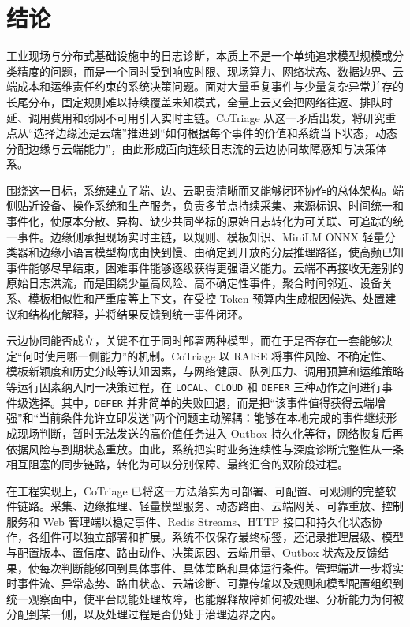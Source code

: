 \chapter{结论}

工业现场与分布式基础设施中的日志诊断，本质上不是一个单纯追求模型规模或分类精度的问题，而是一个同时受到响应时限、现场算力、网络状态、数据边界、云端成本和运维责任约束的系统决策问题。面对大量重复事件与少量复杂异常并存的长尾分布，固定规则难以持续覆盖未知模式，全量上云又会把网络往返、排队时延、调用费用和弱网不可用引入实时主链。CoTriage 从这一矛盾出发，将研究重点从“选择边缘还是云端”推进到“如何根据每个事件的价值和系统当下状态，动态分配边缘与云端能力”，由此形成面向连续日志流的云边协同故障感知与决策体系。

围绕这一目标，系统建立了端、边、云职责清晰而又能够闭环协作的总体架构。端侧贴近设备、操作系统和生产服务，负责多节点持续采集、来源标识、时间统一和事件化，使原本分散、异构、缺少共同坐标的原始日志转化为可关联、可追踪的统一事件。边缘侧承担现场实时主链，以规则、模板知识、MiniLM ONNX 轻量分类器和边缘小语言模型构成由快到慢、由确定到开放的分层推理路径，使高频已知事件能够尽早结束，困难事件能够逐级获得更强语义能力。云端不再接收无差别的原始日志洪流，而是围绕少量高风险、高不确定性事件，聚合时间邻近、设备关系、模板相似性和严重度等上下文，在受控 Token 预算内生成根因候选、处置建议和结构化解释，并将结果反馈到统一事件闭环。

云边协同能否成立，关键不在于同时部署两种模型，而在于是否存在一套能够决定“何时使用哪一侧能力”的机制。CoTriage 以 RAISE 将事件风险、不确定性、模板新颖度和历史分歧等认知因素，与网络健康、队列压力、调用预算和运维策略等运行因素纳入同一决策过程，在 \texttt{LOCAL}、\texttt{CLOUD} 和 \texttt{DEFER} 三种动作之间进行事件级选择。其中，\texttt{DEFER} 并非简单的失败回退，而是把“该事件值得获得云端增强”和“当前条件允许立即发送”两个问题主动解耦：能够在本地完成的事件继续形成现场判断，暂时无法发送的高价值任务进入 Outbox 持久化等待，网络恢复后再依据风险与到期状态重放。由此，系统把实时业务连续性与深度诊断完整性从一条相互阻塞的同步链路，转化为可以分别保障、最终汇合的双阶段过程。

在工程实现上，CoTriage 已将这一方法落实为可部署、可配置、可观测的完整软件链路。采集、边缘推理、轻量模型服务、动态路由、云端网关、可靠重放、控制服务和 Web 管理端以稳定事件、Redis Streams、HTTP 接口和持久化状态协作，各组件可以独立部署和扩展。系统不仅保存最终标签，还记录推理层级、模型与配置版本、置信度、路由动作、决策原因、云端用量、Outbox 状态及反馈结果，使每次判断能够回到具体事件、具体策略和具体运行条件。管理端进一步将实时事件流、异常态势、路由状态、云端诊断、可靠传输以及规则和模型配置组织到统一观察面中，使平台既能处理故障，也能解释故障如何被处理、分析能力为何被分配到某一侧，以及处理过程是否仍处于治理边界之内。

